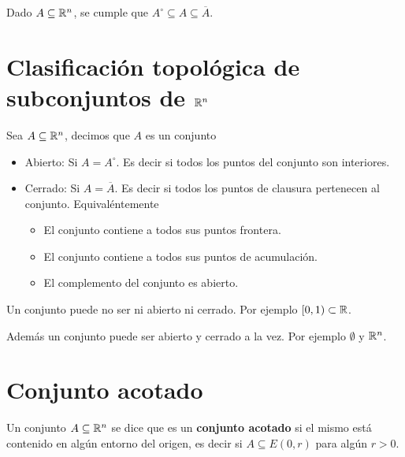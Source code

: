 \begin{observation}

Dado $A \subseteq \mathbb{R}^n$, se cumple que $ A^{\circ} \subseteq A \subseteq \overline{A}$.

\end{observation}

\section{Clasificación topológica de subconjuntos de $\mathbb{R}^n$}

\begin{definition}[Abierto]
Sea $A \subseteq \mathbb{R}^n$, decimos que $A$ es un conjunto

\begin{itemize}
\item Abierto: Si $A=A^{\circ}$.  Es decir si todos los puntos del conjunto son interiores.

\item Cerrado: Si $A = \overline{A}$.  Es decir si todos los puntos de clausura pertenecen al conjunto. Equivaléntemente
\begin{itemize}
\item El conjunto contiene a todos sus puntos frontera.
\item El conjunto contiene a todos sus puntos de acumulación.  
\item El complemento del conjunto es abierto.
\end{itemize}
\end{itemize}
\end{definition}

\begin{observation}
Un conjunto puede no ser ni abierto ni cerrado. Por ejemplo $ [0,1) \subset \mathbb{R}$.

Además un conjunto puede ser abierto y cerrado a la vez. Por ejemplo $ \emptyset$ y $ \mathbb{R}^n$.
\end{observation}

\section{Conjunto acotado}

\begin{definition}[Acotado]
Un conjunto $A \subseteq \mathbb{R}^n$ se dice que es un \textbf{conjunto acotado}  si el mismo está contenido en algún entorno del origen, es decir si $ A \subseteq E(0, r)$ para algún $r > 0$.
\end{definition}

